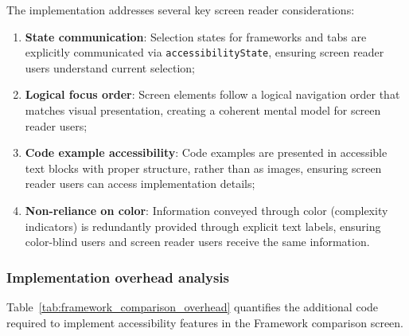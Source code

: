 The implementation addresses several key screen reader considerations:

\begin{enumerate}
    \item \textbf{State communication}: Selection states for frameworks and tabs are explicitly communicated via \texttt{accessibilityState}, ensuring screen reader users understand current selection;
    
    \item \textbf{Logical focus order}: Screen elements follow a logical navigation order that matches visual presentation, creating a coherent mental model for screen reader users;
    
    \item \textbf{Code example accessibility}: Code examples are presented in accessible text blocks with proper structure, rather than as images, ensuring screen reader users can access implementation details;
    
    \item \textbf{Non-reliance on color}: Information conveyed through color (complexity indicators) is redundantly provided through explicit text labels, ensuring color-blind users and screen reader users receive the same information.
\end{enumerate}

\subsubsection{Implementation overhead analysis}

Table~\ref{tab:framework_comparison_overhead} quantifies the additional code required to implement accessibility features in the Framework comparison screen.

